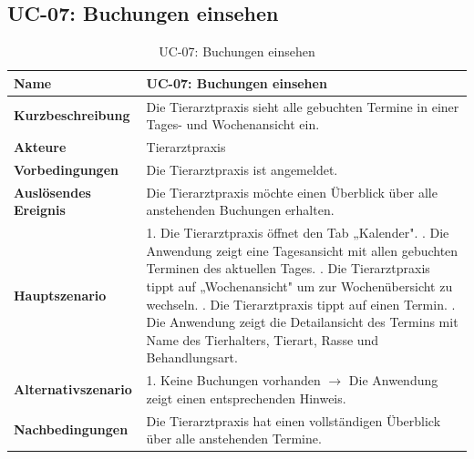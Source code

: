 \subsection*{UC-07: Buchungen einsehen}
\renewcommand{\arraystretch}{1.5}
\begin{table}[H]
\begin{tabular}{|p{5cm}|p{9cm}|}
\hline
\textbf{Name} & UC-07: Buchungen einsehen \\
\hline
\textbf{Kurzbeschreibung} & Die Tierarztpraxis sieht alle gebuchten 
Termine in einer Tages- und Wochenansicht ein. \\
\hline
\textbf{Akteure} & Tierarztpraxis \\
\hline
\textbf{Vorbedingungen} & 
Die Tierarztpraxis ist angemeldet. \\
\hline
\textbf{Auslösendes Ereignis} & Die Tierarztpraxis möchte einen 
Überblick über alle anstehenden Buchungen erhalten. \\
\hline
\textbf{Hauptszenario} &
1. Die Tierarztpraxis öffnet den Tab „Kalender". \newline
2. Die Anwendung zeigt eine Tagesansicht mit allen gebuchten 
Terminen des aktuellen Tages. \newline
3. Die Tierarztpraxis tippt auf „Wochenansicht" um zur 
Wochenübersicht zu wechseln. \newline
4. Die Tierarztpraxis tippt auf einen Termin. \newline
5. Die Anwendung zeigt die Detailansicht des Termins mit 
Name des Tierhalters, Tierart, Rasse und Behandlungsart. \\
\hline
\textbf{Alternativszenario} &
1. Keine Buchungen vorhanden $\rightarrow$ Die Anwendung zeigt 
einen entsprechenden Hinweis. \\
\hline
\textbf{Nachbedingungen} &
Die Tierarztpraxis hat einen vollständigen Überblick über 
alle anstehenden Termine. \\
\hline
\end{tabular}
\caption{UC-07: Buchungen einsehen}
\label{tab:uc-07}
\end{table}

